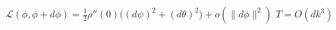 \documentclass{article}
\begin{document}
$\mathcal{L}(\phi,\phi+d\phi)=\frac{1}{2}\rho''(0)\Big((d\psi)^2+(d\theta)^2\Big)+o\!\left(\|d\phi\|^2\right)$
$T=O(dk^3)$
\end{document}
